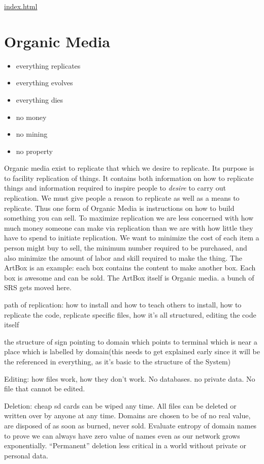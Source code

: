 \url{index.html}

\section{Organic Media}\label{organic-media}

\begin{itemize}
\item
  everything replicates
\item
  everything evolves
\item
  everything dies
\item
  no money
\item
  no mining
\item
  no property
\end{itemize}

Organic media exist to replicate that which we desire to replicate.  Its purpose is to facility replication of things.  It contains both information on how to replicate things and information required to inspire people to \emph{desire} to carry out replication.  We must give people a reason to replicate as well as a means to replicate.  Thus one form of Organic Media is instructions on how to build something you can sell.  To maximize replication we are less concerned with how much money someone can make via replication than we are with how little they have to spend to initiate replication.  We want to minimize the cost of each item a person might buy to sell, the minimum number required to be purchased, and also minimize the amount of labor and skill required to make the thing.  The ArtBox is an example: each box contains the content to make another box.  Each box is awesome and can be sold.  The ArtBox itself is Organic media.  a bunch of SRS gets moved here.



path of replication: how to install and how to teach others to install,
how to replicate the code, replicate specific files, how it's all
structured, editing the code itself

the structure of sign pointing to domain which points to terminal which
is near a place which is labelled by domain(this needs to get explained
early since it will be the referenced in everything, as it's basic to
the structure of the System)

Editing: how files work, how they don't work. No databases. no private
data. No file that cannot be edited.

Deletion: cheap sd cards can be wiped any time. All files can be deleted
or written over by anyone at any time. Domains are chosen to be of no
real value, are disposed of as soon as burned, never sold. Evaluate
entropy of domain names to prove we can always have zero value of names
even as our network grows exponentially. ``Permanent'' deletion less
critical in a world without private or personal data.

